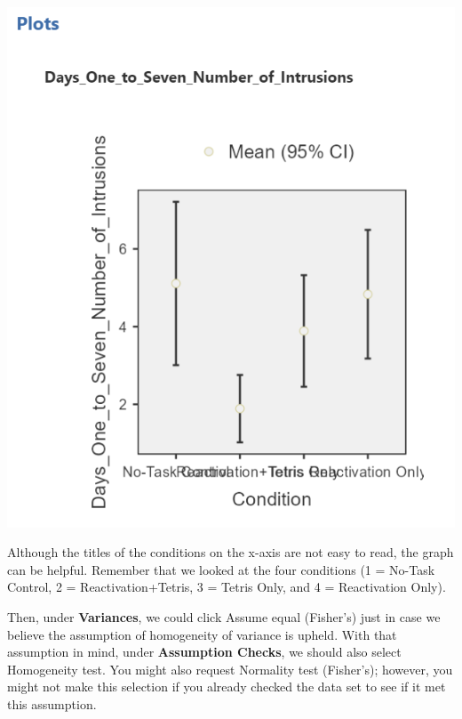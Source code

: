 \documentclass[
]{book}
\begin{document}
\includegraphics{img/OneWayANOVAResultsDescriptivePlot.png}

Although the titles of the conditions on the x-axis are not easy to read, the graph can be helpful. Remember that we looked at the four conditions (1 = No-Task Control, 2 = Reactivation+Tetris, 3 = Tetris Only, and 4 = Reactivation Only).

Then, under \textbf{Variances}, we could click {Assume equal (Fisher's)} just in case we believe the assumption of homogeneity of variance is upheld. With that assumption in mind, under \textbf{Assumption Checks}, we should also select {Homogeneity test}. You might also request {Normality test (Fisher's)}; however, you might not make this selection if you already checked the data set to see if it met this assumption.
\end{document}
